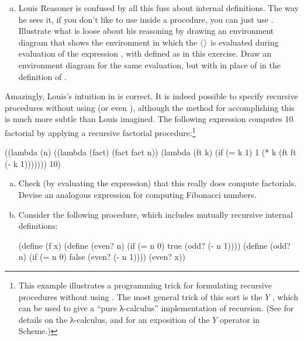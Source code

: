 \begin{exerciseGroup}
\begin{enumerate}[a.]
\item
Louis Reasoner is confused by all this fuss about internal definitions.  The
way he sees it, if you don't like to use  inside a procedure, you
can just use .  Illustrate what is loose about his reasoning by
drawing an environment diagram that shows the environment in which the
\( \langle \)\( \kern0.08em\rangle \) is evaluated during evaluation of the
expression , with  defined as in this exercise.  Draw an
environment diagram for the same evaluation, but with  in place of
 in the definition of .

\end{enumerate}

\label{Exercise 4.21}
 Amazingly,
Louis's intuition in  is correct. It is indeed possible to
specify recursive procedures without using  (or even ),
although the method for accomplishing this is much more subtle than Louis imagined.
The following expression computes 10 factorial by applying a recursive factorial
procedure:\footnote{This example illustrates a programming trick for
formulating recursive procedures without using .  The most general
trick of this sort is the \( Y \) , which can be used to give a
``pure λ-calculus'' implementation of recursion.  (See  for
details on the λ-calculus, and  for an exposition of the
\( Y \) operator in Scheme.)}

\begin{codeBlock}
((lambda (n)
   ((lambda (fact) (fact fact n))
    (lambda (ft k) (if (= k 1)
                       1
                       (* k (ft ft (- k 1)))))))
 10)
\end{codeBlock}

\begin{enumerate}[a.]

\item
Check (by evaluating the expression) that this really does compute factorials.
Devise an analogous expression for computing Fibonacci numbers.

\item
Consider the following procedure, which includes mutually recursive internal
definitions:

\begin{codeBlock}
(define (f x)
  (define (even? n)
    (if (= n 0) true  (odd?  (- n 1))))
  (define (odd? n)
    (if (= n 0) false (even? (- n 1))))
  (even? x))
\end{codeBlock}


\end{enumerate}
\end{exerciseGroup}

